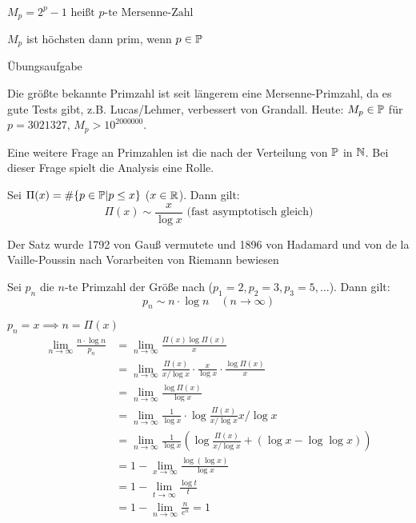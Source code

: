 \documentclass[a4paper,DIV15,BCOR12mm]{article}
\begin{document}
\begin{definition}
$M_p = 2^p - 1 \text{ heißt $p$-te Mersenne-Zahl}$
\end{definition}

\begin{satz}
$M_p$ ist höchsten dann prim, wenn $p\in\mathbb{P}$
\end{satz}
\begin{beweis}
Übungsaufgabe
\end{beweis}

Die größte bekannte Primzahl ist seit längerem eine
Mersenne-Primzahl, da es gute Tests gibt, z.B. Lucas/Lehmer,
verbessert von Grandall. Heute: $M_p\in\mathbb{P}$ für $p=3021327$,
$M_p>10^{2000000}$.

Eine weitere Frage an Primzahlen ist die nach der Verteilung von
$\mathbb{P}$ in $\mathbb{N}$. Bei dieser Frage spielt die Analysis eine Rolle.
\begin{satz}
Sei $\Pi(x) = \#\{p\in\mathbb{P}|p\le x\}$ ($x\in\mathbb{R}$). Dann gilt:
\[ \Pi(x) \sim \frac{x}{\log x} \text{ (fast asymptotisch gleich)} \]
\end{satz}
Der Satz wurde 1792 von Gauß vermutete und 1896 von Hadamard und von
de la Vaille-Poussin nach Vorarbeiten von Riemann bewiesen

\begin{folgerung}
Sei $p_n$ die $n$-te Primzahl der Größe nach ($p_1=2, p_2=3,
p_3=5,\ldots$). Dann gilt:
\[ p_n \sim n\cdot \log n \quad (n\to\infty) \]
\end{folgerung}
\begin{beweis}
$p_n = x \implies n=\Pi(x)$
\begin{align*}
\lim_{n\to\infty} \frac{n\cdot \log n}{p_n} &= \lim_{n\to\infty} \frac{\Pi(x) \log \Pi(x)}{x}\\
&= \lim_{n\to\infty} \frac{\Pi(x)}{x/\log x} \cdot \frac{x}{\log x} \cdot \frac{\log \Pi(x)}{x} \\
&= \lim_{n\to\infty} \frac {\log  \Pi(x)}{\log x}\\
&= \lim_{n\to\infty} \frac1{\log x} \cdot \log \frac{\Pi(x)}{x/\log x} x/\log x\\
&= \lim_{n\to\infty} \frac{1}{\log x} \left( \log \frac{\Pi(x)}{x/\log x} + (\log x - \log \log x) \right) \\
&= 1 - \lim_{x\to\infty} \frac{\log(\log x)}{\log x}\\
&= 1 - \lim_{t\to\infty} \frac{\log t}t\\
&= 1 - \lim_{n\to\infty}\frac n {e^n} = 1
\end{align*}
\end{beweis}
\end{document}
